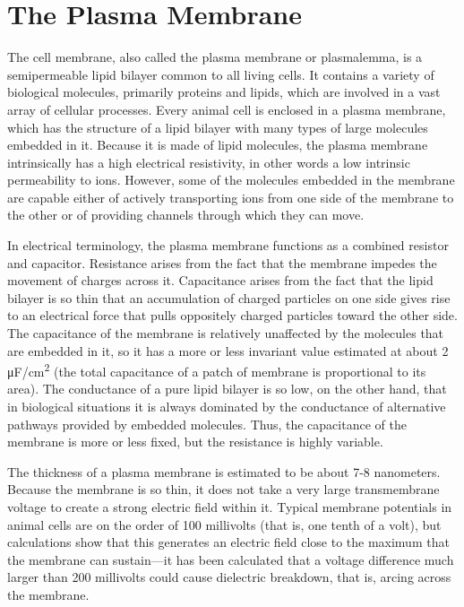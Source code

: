 \hypertarget{the-plasma-membrane}{%
\section{The Plasma Membrane}\label{the-plasma-membrane}}

The cell membrane, also called the plasma membrane or plasmalemma, is a semipermeable lipid bilayer common to all living cells. It contains a variety of biological molecules, primarily proteins and lipids, which are involved in a vast array of cellular processes.
Every animal cell is enclosed in a plasma membrane, which has the structure of a lipid bilayer with many types of large molecules embedded in it. Because it is made of lipid molecules, the plasma membrane intrinsically has a high electrical resistivity, in other words a low intrinsic permeability to ions. However, some of the molecules embedded in the membrane are capable either of actively transporting ions from one side of the membrane to the other or of providing channels through which they can move.

In electrical terminology, the plasma membrane functions as a combined resistor and capacitor. Resistance arises from the fact that the membrane impedes the movement of charges across it. Capacitance arises from the fact that the lipid bilayer is so thin that an accumulation of charged particles on one side gives rise to an electrical force that pulls oppositely charged particles toward the other side. The capacitance of the membrane is relatively unaffected by the molecules that are embedded in it, so it has a more or less invariant value estimated at about 2 μF/cm\textsuperscript{2} (the total capacitance of a patch of membrane is proportional to its area). The conductance of a pure lipid bilayer is so low, on the other hand, that in biological situations it is always dominated by the conductance of alternative pathways provided by embedded molecules. Thus, the capacitance of the membrane is more or less fixed, but the resistance is highly variable.

The thickness of a plasma membrane is estimated to be about 7-8 nanometers. Because the membrane is so thin, it does not take a very large transmembrane voltage to create a strong electric field within it. Typical membrane potentials in animal cells are on the order of 100 millivolts (that is, one tenth of a volt), but calculations show that this generates an electric field close to the maximum that the membrane can sustain---it has been calculated that a voltage difference much larger than 200 millivolts could cause dielectric breakdown, that is, arcing across the membrane.

